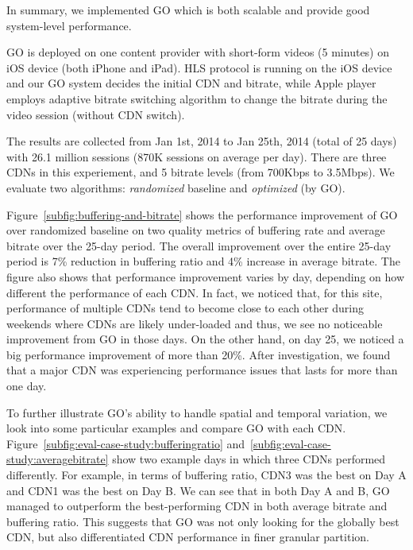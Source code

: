 In summary, we implemented GO which is both scalable and provide good system-level performance.


\label{subsec:eval_setup}

GO is deployed on one content provider with short-form videos (5 minutes) on iOS device (both iPhone and iPad). 
HLS protocol is running on the iOS device and our GO system decides the initial CDN and bitrate, while Apple player employs adaptive 
bitrate switching algorithm to change the bitrate during the video session (without CDN switch). 

The results are collected from Jan 1st, 2014 to Jan 25th, 2014 (total of 25 days) with 26.1 million sessions (870K sessions on average per day).
There are three CDNs in this experiement, and 5 bitrate levels (from 700Kbps to 3.5Mbps). We evaluate two algorithms: {\it randomized} baseline and {\it optimized} (by GO).


\label{subsec:real-world-improvement}


Figure~\ref{subfig:buffering-and-bitrate} shows the performance improvement of GO over randomized baseline on two quality metrics of
buffering rate and average bitrate over the 25-day period. The overall improvement over the entire 25-day period is 7\% reduction in buffering ratio and 4\% increase in 
average bitrate. The figure also shows that performance improvement varies by day, depending on how different the performance of each CDN. 
In fact, we noticed that, for this site, performance of multiple CDNs tend to become close to each other
during weekends where CDNs are likely under-loaded and thus, we see no noticeable improvement from GO in those days. 
On the other hand, on day 25, we noticed a big performance improvement of more than 20\%. After investigation,
we found that a major CDN was experiencing performance issues that lasts for more than one day. 

To further illustrate GO's ability to handle spatial and temporal variation, 
we look into some particular examples and compare GO with each CDN. Figure~\ref{subfig:eval-case-study:bufferingratio} and~\ref{subfig:eval-case-study:averagebitrate} show two example days in which three CDNs performed differently.  For example, in terms of buffering ratio, CDN3 was the best on Day A and CDN1 was the best on Day B. 
We can see that in both Day A and B, GO managed to outperform the best-performing CDN in both average bitrate 
and buffering ratio. This suggests that GO was not only looking for the globally best CDN, but also 
differentiated CDN performance in finer granular partition.


